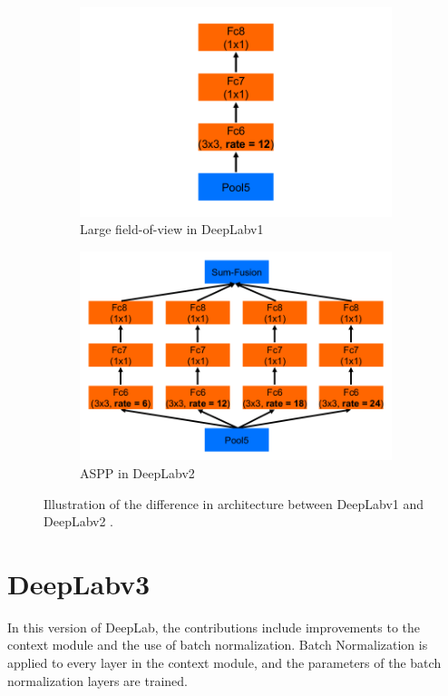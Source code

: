 	\begin{figure}[h]
		\begin{subfigure}{.5\textwidth}
			\centering
			\includegraphics[width=1.03\linewidth]{images/v1_largeFOV}
			\caption{Large field-of-view in DeepLabv1}
		\end{subfigure}
		\begin{subfigure}{.5\textwidth}
			\centering
			\includegraphics[width=1\linewidth]{images/v2_aspp}
			\caption{ASPP in DeepLabv2}
		\end{subfigure}
		\caption{Illustration of the difference in architecture between DeepLabv1 and DeepLabv2 \cite{DBLP:journals/corr/ChenPK0Y16}.}
		\label{Fig:v1vsv2}
	\end{figure}
	
\section{DeepLabv3}
In this version of DeepLab, the contributions include improvements to the context module and the use of batch normalization. Batch Normalization is applied to every layer in the context module, and the parameters of the batch normalization layers are trained.

